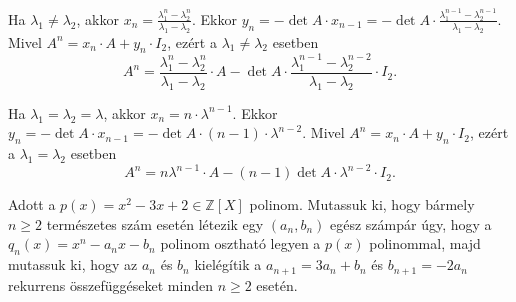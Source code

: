 \begin{solution}
Ha $\lambda_{1}\neq\lambda_{2}$, akkor ${\displaystyle {x_{n}=\frac{\lambda_{1}^{n}-\lambda_{2}^{n}}{\lambda_{1}-\lambda_{2}}}}$.
Ekkor ${\displaystyle {y_{n}=-\det A\cdot x_{n-1}=-\det A\cdot\frac{\lambda_{1}^{n-1}-\lambda_{2}^{n-1}}{\lambda_{1}-\lambda_{2}}}}$.
Mivel $A^{n}=x_{n}\cdot A+y_{n}\cdot I_{2}$, ezért a $\lambda_{1}\neq\lambda_{2}$
esetben 
\[
{\displaystyle {A^{n}=\frac{\lambda_{1}^{n}-\lambda_{2}^{n}}{\lambda_{1}-\lambda_{2}}\cdot A-\det A\cdot\frac{\lambda_{1}^{n-1}-\lambda_{2}^{n-2}}{\lambda_{1}-\lambda_{2}}\cdot I_{2}.}}
\]

Ha $\lambda_{1}=\lambda_{2}=\lambda$, akkor $x_{n}=n\cdot\lambda^{n-1}$.
Ekkor $y_{n}=-\det A\cdot x_{n-1}=-\det A\cdot(n-1)\cdot\lambda^{n-2}$.
Mivel $A^{n}=x_{n}\cdot A+y_{n}\cdot I_{2}$, ezért a $\lambda_{1}=\lambda_{2}$
esetben 
\[
{\displaystyle {A^{n}=n\lambda^{n-1}\cdot A-(n-1)\det A\cdot\lambda^{n-2}\cdot I_{2}.}}
\]
\end{solution}
\begin{extraproblem}
Adott a $p(x)=x^{2}-3x+2\in\mathbb{Z}[X]$ polinom. Mutassuk ki,
hogy bármely $n\geq2$ természetes szám esetén létezik egy $(a_{n},b_{n})$
egész számpár úgy, hogy a $q_{n}(x)=x^{n}-a_{n}x-b_{n}$ polinom osztható
legyen a $p(x)$ polinommal, majd mutassuk ki, hogy az $a_{n}$ és
$b_{n}$ kielégítik a $a_{n+1}=3a_{n}+b_{n}$ és $b_{n+1}=-2a_{n}$
rekurrens összefüggéseket minden $n\geq2$ esetén. 
\end{extraproblem}

